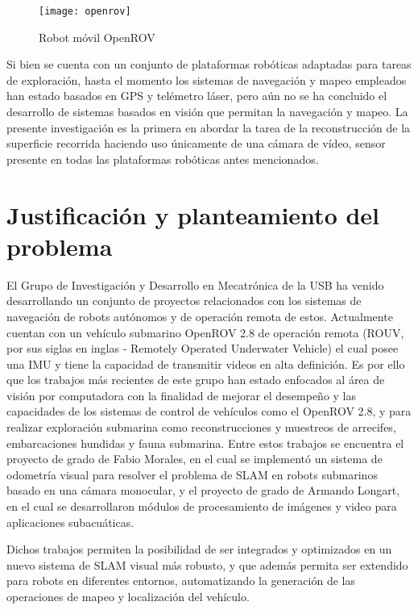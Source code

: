 \begin{figure}[H]
	\centering
	\texttt{[image: openrov]}
	\caption{Robot móvil OpenROV}
	\label{imagen:openrov}
\end{figure}

Si bien se cuenta con un conjunto de plataformas robóticas adaptadas para tareas de exploración, hasta el momento los sistemas de navegación y mapeo empleados han estado basados en GPS y telémetro láser, pero aún no se ha concluido el desarrollo de sistemas basados en visión que permitan la navegación y mapeo. La presente investigación es la primera en abordar la tarea de la reconstrucción de la superficie recorrida haciendo uso únicamente de una cámara de vídeo, sensor presente en todas las plataformas robóticas antes mencionados.

\section{Justificación y planteamiento del problema}

El Grupo de Investigación y Desarrollo en Mecatrónica de la USB ha venido desarrollando un conjunto de proyectos relacionados con los sistemas de navegación de robots autónomos y de operación remota de estos. Actualmente cuentan con un vehículo submarino OpenROV 2.8 de operación remota (ROUV, por sus siglas en inglas - Remotely Operated Underwater Vehicle) el cual posee una IMU y tiene la capacidad de transmitir videos en alta definición. Es por ello que los trabajos más recientes de este grupo han estado enfocados al área de visión por computadora con la finalidad de mejorar el desempeño y las capacidades de los sistemas de control de vehículos como el OpenROV 2.8, y para realizar exploración submarina como reconstrucciones y muestreos de arrecifes, embarcaciones hundidas y fauna submarina. Entre estos trabajos se encuentra el proyecto de grado de Fabio Morales, en el cual se implementó un sistema de odometría visual para resolver el problema de SLAM en robots submarinos basado en una cámara monocular, y el proyecto de grado de  Armando Longart, en el cual se desarrollaron módulos de procesamiento de imágenes y video para aplicaciones subacuáticas.

Dichos trabajos permiten la posibilidad de ser integrados  y optimizados en un nuevo sistema de SLAM visual más robusto, y que además permita ser extendido para robots en diferentes entornos, automatizando la generación de las operaciones de mapeo y localización del vehículo.

